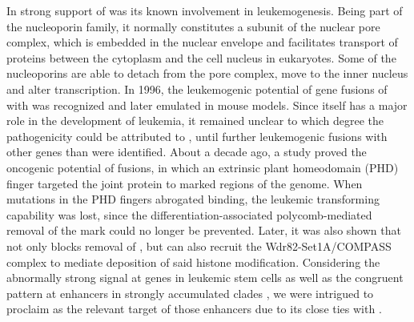 In strong support of  was its known involvement in leukemogenesis. Being part of the nucleoporin family, it normally constitutes a subunit of the nuclear pore complex, which is embedded in the nuclear envelope and facilitates transport of proteins between the cytoplasm and the cell nucleus in eukaryotes\cite{Koehler2010}. Some of the nucleoporins are able to detach from the pore complex, move to the inner nucleus and alter transcription\cite{Griffis2004,Hou2010,Kalverda2010}. In 1996, the leukemogenic potential of gene fusions of  with  was recognized\cite{Nakamura1996,Borrow1996} and later emulated in mouse models\cite{Kroon2001}.  Since  itself has a major role in the development of leukemia, it remained unclear to which degree the pathogenicity could be attributed to , until further leukemogenic fusions with other genes than  were identified\cite{Zutven2006,Wang2007a}. About a decade ago, a study proved the oncogenic potential of  fusions, in which an extrinsic plant homeodomain (PHD) finger targeted the joint protein to \hisfourthree marked regions of the genome\cite{Wang2009}. When mutations in the PHD fingers abrogated \hisfourthree binding, the leukemic transforming capability was lost, since the differentiation-associated polycomb-mediated removal of the mark could no longer be prevented\cite{Wang2009}. Later, it was also shown that  not only blocks removal of \hisfourthree, but can also recruit the Wdr82-Set1A/COMPASS complex to mediate deposition of said histone modification\cite{Franks2017}.  Considering the abnormally strong \hisfourthree signal at genes in \mllafnine leukemic stem cells\cite{Wong2015} as well as the congruent pattern at enhancers in strongly accumulated clades , we were intrigued to proclaim  as the relevant target of those enhancers due to its close ties with \hisfourthree. 

